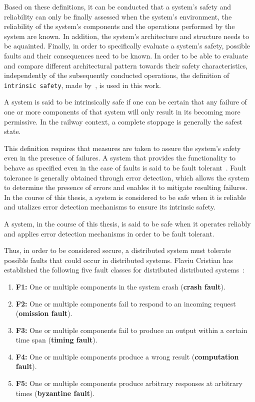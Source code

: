 Based on these definitions, it can be conducted that a system's safety and reliability can only be finally assessed when the system's environment, the reliability of the system's components and the operations performed by the system are known.
In addition, the system's architecture and structure needs to be aquainted.
Finally, in order to specifically evaluate a system's safety, possible faults and their consequences need to be known.
In order to be able to evaluate and compare different architectural pattern towards their safety characteristics, independently of the subsequently conducted operations, the definition of \texttt{intrinsic safety}, made by~\cite{BoulangerStandards}, is used in this work.

\begin{definition}
A system is said to be intrinsically safe if one can be certain that any failure of one or more components of that system will only result in its becoming more permissive.
In the railway context, a complete stoppage is generally the safest state.
\label{def:intrinsic_safety}
\end{definition}

This definition requires that measures are taken to assure the system's safety even in the presence of failures.
A system that provides the functionality to behave as specified even in the case of faults is said to be fault tolerant~\cite{AvizienisDependability2001}.
Fault tolerance is generally obtained through error detection, which allows the system to determine the presence of errors and enables it to mitigate resulting failures.
In the course of this thesis, a system is considered to be safe when it is reliable and utalizes error detection mechanisms to ensure its intrinsic safety.
\begin{definition}
A system, in the course of this thesis, is said to be safe when it operates reliably and applies error detection mechanisms in order to be fault tolerant.
\label{def:safety}
\end{definition}

Thus, in order to be considered secure, a distributed system must tolerate possible faults that could occur in distributed systems.
Flaviu Cristian has established the following five fault classes for distributed distributed systems~\cite{CristianFaultModel}:

\begin{enumerate}
\item \textbf{F1:} One or multiple components in the system crash (\textbf{crash fault}).
\item \textbf{F2:} One or multiple components fail to respond to an incoming request (\textbf{omission fault}).
\item \textbf{F3:} One or multiple components fail to produce an output within a certain time span (\textbf{timing fault}).
\item \textbf{F4:} One or multiple components produce a wrong result (\textbf{computation fault}).
\item \textbf{F5:} One or multiple components produce arbitrary responses at arbitrary times (\textbf{byzantine fault}).
\end{enumerate}

